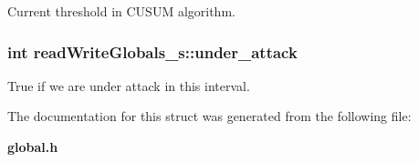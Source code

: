 Current threshold in C\+U\+S\+U\+M algorithm. 

\subsubsection[{under\+\_\+attack}]{\setlength{\rightskip}{0pt plus 5cm}int read\+Write\+Globals\+\_\+s\+::under\+\_\+attack}\label{structread_write_globals__s_ad551f8a051aae2dbd30c2575377d771f}


True if we are under attack in this interval. 



The documentation for this struct was generated from the following file\+:\begin{DoxyCompactItemize}
\item 
{\bf global.\+h}\end{DoxyCompactItemize}
